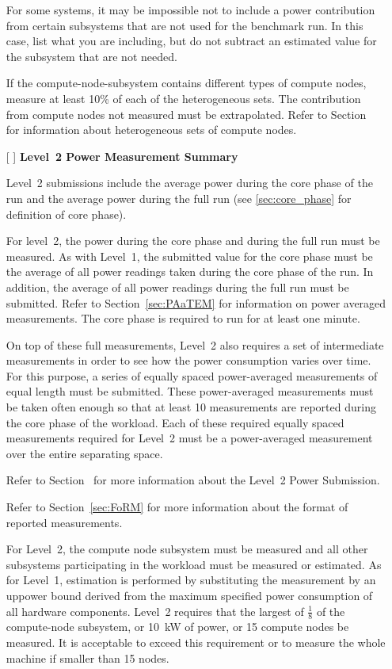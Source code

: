 \begin{itemize}
For some systems, it may be impossible not to include a power contribution from certain subsystems that are not used for the benchmark run.
In this case, list what you are including, but do not subtract an estimated value for the subsystem that are not needed.

If the compute-node-subsystem contains different types of compute nodes, measure at least 10\% of each of the heterogeneous sets.
The contribution from compute nodes not measured must be extrapolated.
Refer to Section~ for information about heterogeneous sets of compute nodes.

\newpage
\item[{[ ]}]
\textbf{Level~2 Power Measurement Summary}

Level~2 submissions include the average power during the core phase of the run and the average power during the full run (see \ref{sec:core_phase} for definition of core phase).

For level~2, the power during the core phase and during the full run must be measured.
As with Level~1, the submitted value for the core phase must be the average of all power readings taken during the core phase of the run.
In addition, the average of all power readings during the full run must be submitted.
Refer to Section~\ref{sec:PAaTEM} for information on power averaged measurements.
The core phase is required to run for at least one minute.

On top of these full measurements, Level~2 also requires a set of intermediate measurements in order to see how the power consumption varies over time.
For this purpose, a series of equally spaced power-averaged measurements of equal length must be submitted.
These power-averaged measurements must be taken often enough so that at least 10 measurements are reported during the core phase of the workload.
Each of these required equally spaced measurements required for Level~2 must be a power-averaged measurement over the entire separating space.

Refer to Section~ for more information about the Level~2 Power Submission.

Refer to Section~\ref{sec:FoRM} for more information about the format of reported measurements.

For Level~2, the compute node subsystem must be measured and all other subsystems participating in the workload must be measured or estimated.
As for Level~1, estimation is performed by substituting the measurement by an uppower bound derived from the maximum specified power consumption of all hardware components.
Level~2 requires that the largest of $\frac{1}{8}$ of the compute-node subsystem, or 10~kW of power, or 15 compute nodes be measured.
It is acceptable to exceed this requirement or to measure the whole machine if smaller than 15 nodes.


\end{itemize}
